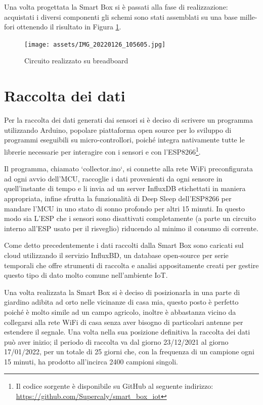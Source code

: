 \documentclass[fleqn, 10pt]{SelfArx}
\begin{document}
Una volta progettata la Smart Box si è passati alla fase di realizzazione: acquistati i diversi componenti gli schemi sono stati assemblati su una base mille-fori ottenendo il risultato in Figura \ref{fig:assembled}.

\begin{figure}[htb]
\centering
\texttt{[image: assets/IMG\_20220126\_105605.jpg]}
\caption{Circuito realizzato su breadboard}
\label{fig:assembled}
\end{figure}

\section{Raccolta dei dati}

Per la raccolta dei dati generati dai sensori si è deciso di scrivere un programma utilizzando Arduino\cite{arduino}, popolare piattaforma open source per lo sviluppo di programmi eseguibili su micro-controllori, poiché 
integra nativamente tutte le librerie necessarie per interagire con i sensori e con l'ESP8266\footnote{Il codice sorgente è disponibile su GitHub al seguente indirizzo: 
\url{https://github.com/Supercaly/smart_box_iot}}. 

Il programma, chiamato `collector.ino`, si connette alla rete WiFi preconfigurata ad ogni avvio dell'MCU, raccoglie i dati provenienti da ogni sensore in quell'instante di tempo e li invia ad un server InfluxDB\cite{influxdb} 
etichettati in maniera appropriata, infine sfrutta la funzionalità di Deep Sleep dell'ESP8266 per mandare l'MCU in uno stato di sonno profondo per altri 15 minuti. In questo modo sia L'ESP che i sensori sono 
disattivati completamente (a parte un circuito interno all'ESP usato per il risveglio) riducendo al minimo il consumo di corrente.

Come detto precedentemente i dati raccolti dalla Smart Box sono caricati sul cloud utilizzando il servizio InfluxBD, un database open-source per serie temporali che offre strumenti di raccolta e analisi appositamente 
creati per gestire questo tipo di dato molto comune nell'ambiente IoT.


Una volta realizzata la Smart Box si è deciso di posizionarla in una parte di giardino adibita ad orto nelle vicinanze di casa mia, questo posto è perfetto poiché è molto simile ad un campo agricolo, 
inoltre è abbastanza vicino da collegarsi alla rete WiFi di casa senza aver bisogno di particolari antenne per estendere il segnale. 
Una volta nella sua posizione definitiva la raccolta dei dati può aver inizio; il periodo di raccolta va dal giorno 23/12/2021 al giorno 17/01/2022, per un totale di 25 giorni che, con la frequenza di un campione 
ogni 15 minuti, ha prodotto all'incirca 2400 campioni singoli.
\end{document}
